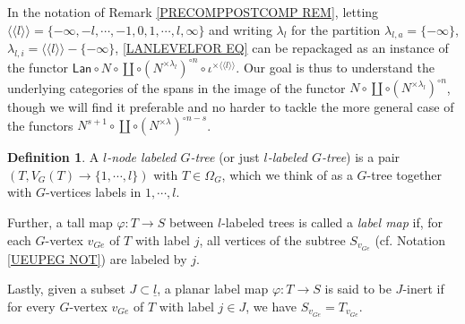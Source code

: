 \documentclass[a4paper,10pt
,draft
]{article}%
\numberwithin{equation}{section}
\numberwithin{figure}{section}
\theoremstyle{definition} %
\newtheorem{definition}[equation]{Definition}%
\newcommand{\1}{\ensuremath{\mathbbm 1}}%
\begin{document}
In the notation 
of Remark \ref{PRECOMPPOSTCOMP REM},
letting 
$\langle \langle l 
\rangle \rangle = 
\{-\infty,-l,\cdots, -1, 0, 1, \cdots, l, \infty\}$ and writing
$\lambda_{l}$ for the partition
$\lambda_{l,a} = \{-\infty\}$,
$\lambda_{l,i} = 
\langle \langle l \rangle \rangle - \{-\infty\}$,
\eqref{LANLEVELFOR EQ}
can be repackaged as an instance of the functor
$\mathsf{Lan} \circ N \circ \coprod \circ (N^{\times \lambda_l})^{\circ n}\circ \iota^{\times \langle \langle l \rangle \rangle}$.
Our goal is thus to understand 
the underlying categories of the spans in the image of the functor
$N \circ \coprod \circ (N^{\times \lambda_l})^{\circ n}$,
though we will find it preferable and no harder to tackle the more general case of the functors 
$N^{s+1} \circ \coprod \circ (N^{\times \lambda})^{\circ n-s}$.

\begin{definition}\label{LABMAP DEF}
A \textit{$l$-node labeled $G$-tree} (or just \textit{$l$-labeled $G$-tree}) is a pair $(T,V_G(T) \to \{1,\cdots,l\})$ with $T \in \Omega_G$, which we think of as a $G$-tree together with $G$-vertices labels in $1,\cdots,l$.

Further, a tall map $\varphi \colon T \to S$ between $l$-labeled trees is called a \textit{label map} if, for each $G$-vertex $v_{G e}$ of $T$ with label $j$, all vertices of the subtree $S_{v_{G e}}$ 
(cf. Notation \ref{UEUPEG NOT}) are labeled by $j$.

Lastly, given a subset $J\subset \underline{l}$, a planar label map $\varphi \colon T \to S$ is said to be $J$-inert if for every $G$-vertex $v_{G e}$ of $T$ with label $j \in J$, we have $S_{v_{Ge}} = T_{v_{Ge}}$.
\end{definition}
\end{document}
